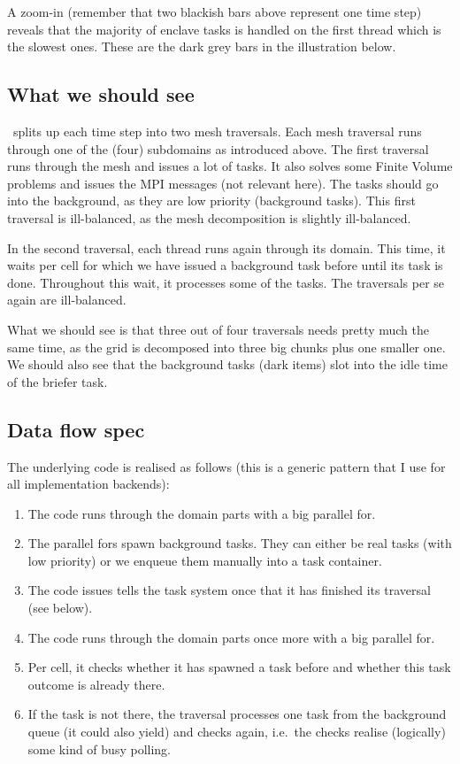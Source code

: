 \noindent
A zoom-in (remember that two blackish bars above represent one time step)
reveals that the majority of enclave tasks is handled on the first thread which
is the slowest ones.
These are the dark grey bars in the illustration below.



\subsection{What we should see}

\Peano\ splits up each time step into two mesh traversals.
Each mesh traversal runs through one of the (four) subdomains as introduced
above. 
The first traversal runs through the mesh and issues a lot of tasks.
It also solves some Finite Volume problems and issues the MPI messages (not
relevant here).
The tasks should go into the background, as they are low priority (background
tasks).
This first traversal is ill-balanced, as the mesh decomposition is slightly
ill-balanced.


In the second traversal, each thread runs again through its domain.
This time, it waits per cell for which we have issued a background task before
until its task is done.
Throughout this wait, it processes some of the tasks.
The traversals per se again are ill-balanced. 


What we should see is that three out of four traversals needs pretty much the
same time, as the grid is decomposed into three big chunks plus one smaller one.
We should also see that the background tasks (dark items) slot into the idle
time of the briefer task.


\subsection{Data flow spec}

The underlying code is realised as follows (this is a generic pattern that I
use for all implementation backends):

\begin{enumerate}
  \item The code runs through the domain parts with a big parallel for.
  \item The parallel fors spawn background tasks. They can either be real tasks
  (with low priority) or we enqueue them manually into a task container.
  \item The code issues tells the task system once that it has finished its
  traversal (see below).
  \item The code runs through the domain parts once more with a big parallel
  for.
  \item Per cell, it checks whether it has spawned a task before and whether
  this task outcome is already there.
  \item If the task is not there, the traversal processes one task from the
  background queue (it could also yield) and checks again, i.e.~the checks
  realise (logically) some kind of busy polling.
\end{enumerate}


